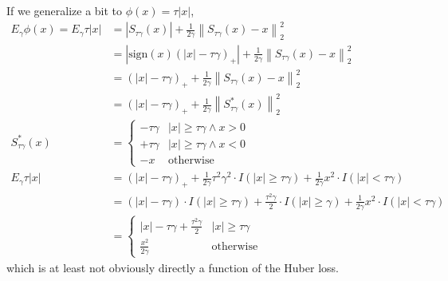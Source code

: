 \documentclass{article}
\begin{document}
If we generalize a bit to $\phi(x)=\tau |x|$,
\begin{align*}
E_\gamma \phi(x)=E_\gamma \tau|x|&=\left|S_{\tau\gamma}(x)\right|+\frac{1}{2\gamma}\left\lVert S_{\tau\gamma}(x) - x \right\rVert_2^2\\
&=\left|\textrm{sign}(x)\left(|x|-\tau\gamma\right)_+\right|+\frac{1}{2\gamma}\left\lVert S_{\tau\gamma}(x) - x \right\rVert_2^2\\
&=\left(|x|-\tau\gamma\right)_+ + \frac{1}{2\gamma}\left\lVert S_{\tau\gamma}(x) - x \right\rVert_2^2\\
&=\left(|x|-\tau\gamma\right)_+ + \frac{1}{2\gamma}\left\lVert S_{\tau\gamma}^*(x) \right\rVert_2^2\\
S_{\tau\gamma}^*(x)&=\left\{\begin{array}{cc}
-\tau\gamma & |x| \geq \tau\gamma \wedge x > 0\\
+ \tau\gamma & |x| \geq \tau\gamma \wedge x < 0\\
-x & \textrm{otherwise}
\end{array}\right.\\
E_\gamma \tau|x|&=\left(|x|-\tau\gamma\right)_+ + \frac{1}{2\gamma} \tau^2\gamma^2 \cdot I(|x|\geq\tau\gamma) + \frac{1}{2\gamma} x^2 \cdot I(|x|<\tau\gamma)\\
&=\left(|x|-\tau\gamma\right)\cdot I(|x|\geq\tau\gamma) + \frac{\tau^2\gamma}{2} \cdot I(|x|\geq\gamma) + \frac{1}{2\gamma} x^2 \cdot I(|x|<\tau\gamma)\\
&=\left\{\begin{array}{cc}
|x|-\tau\gamma+\frac{\tau^2\gamma}{2} & |x| \geq \tau\gamma\\
\frac{x^2}{2\gamma} & \textrm{otherwise}
\end{array}\right.
\end{align*}
which is at least not obviously directly a function of the Huber loss.
\end{document}
